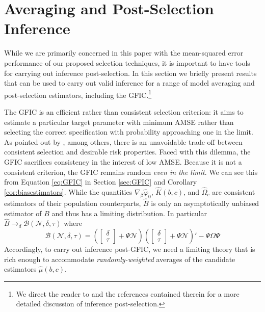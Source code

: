 \section{Averaging and Post-Selection Inference}
\label{sec:avg}

While we are primarily concerned in this paper with the mean-squared error performance of our proposed selection techniques, it is important to have tools for carrying out  inference post-selection.
In this section we briefly present results that can be used to carry out valid inference for a range of model averaging and post-selection estimators, including the GFIC.\footnote{We direct the reader to \cite{DiTraglia2016} and the references contained therein for a more detailed discussion of inference post-selection.}

The GFIC is an efficient rather than consistent selection criterion: it aims to estimate a particular target parameter with minimum AMSE rather than selecting the correct specification with probability approaching one in the limit.
As pointed out by \cite{Yang2005}, among others, there is an unavoidable trade-off between consistent selection and desirable risk properties.
Faced with this dilemma, the GFIC sacrifices consistency in the interest of low AMSE.
Because it is not a consistent criterion, the GFIC remains random \emph{even in the limit}.
We can see this from Equation \ref{eq:GFIC} in Section \ref{sec:GFIC} and Corollary \ref{cor:biasestimators}.
While the quantities $\nabla_\beta \widehat{\varphi}_0$, $\widehat{K}(b,c)$, and $\widehat{\Omega}_c$ are consistent estimators of their population counterparts, $\widehat{B}$ is only an asymptotically unbiased estimator of $B$ and thus has a limiting distribution.
In particular $\widehat{B} \rightarrow_d \mathscr{B}(\mathscr{N}, \delta, \tau)$ where
\begin{equation}
  \mathscr{B}(\mathscr{N}, \delta, \tau) = 
  \left(\left[
  \begin{array}{c}
    \delta \\ \tau
  \end{array}
\right] + \Psi \mathscr{N}\right)
  \left(\left[
  \begin{array}{c}
    \delta \\ \tau
  \end{array}
\right] + \Psi \mathscr{N}\right)' - \Psi \Omega \Psi
\end{equation}
Accordingly, to carry out inference post-GFIC, we need a limiting theory that is rich enough to accommodate \emph{randomly-weighted} averages of the candidate estimators $\widehat{\mu}(b,c)$.
